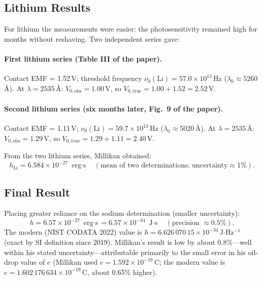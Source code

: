 \documentclass[12pt]{article}
\begin{document}
\subsection{Lithium Results}

For lithium the measurements were easier: the photosensitivity remained
high for months without reshaving.  Two independent series gave:

\paragraph{First lithium series (Table III of the paper).}
Contact EMF = 1.52\,V; threshold frequency $\nu_0(\text{Li}) = 57.0\times10^{13}$\,Hz
($\lambda_0 \approx 5260$\,\AA).  At $\lambda = 2535$\,\AA: $V_{0,\text{obs}} = 1.00$\,V,
so $V_{0,\text{true}} = 1.00 + 1.52 = 2.52$\,V.

\paragraph{Second lithium series (six months later, Fig.\ 9 of the paper).}
Contact EMF = 1.11\,V; $\nu_0(\text{Li}) = 59.7\times10^{13}$\,Hz
($\lambda_0 \approx 5020$\,\AA).  At $\lambda = 2535$\,\AA: $V_{0,\text{obs}} = 1.29$\,V,
so $V_{0,\text{true}} = 1.29 + 1.11 = 2.40$\,V.

From the two lithium series, Millikan obtained:
\[
  h_{\text{Li}} = 6.584\times10^{-27}\text{ erg$\cdot$s}
  \quad
  (\text{mean of two determinations; uncertainty}\approx1\%).
\]

\subsection{Final Result}

Placing greater reliance on the sodium determination (smaller uncertainty):
\begin{equation}\label{eq:h_result}
  \boxed{h = 6.57\times10^{-27}\text{ erg$\cdot$s}
        = 6.57\times10^{-34}\text{ J$\cdot$s}}
  \quad
  (\text{precision } \approx 0.5\%).
\end{equation}
The modern (NIST CODATA 2022) value is
$h = 6.626\,070\,15\times10^{-34}$\,J$\cdot$Hz$^{-1}$ (exact by SI definition
since 2019).  Millikan's result is low by about 0.8\%---well within his
stated uncertainty---attributable primarily to the small error in his
oil-drop value of $e$ (Millikan used $e = 1.592\times10^{-19}$\,C; the modern
value is $e = 1.602\,176\,634\times10^{-19}$\,C, about 0.65\% higher).
\end{document}
